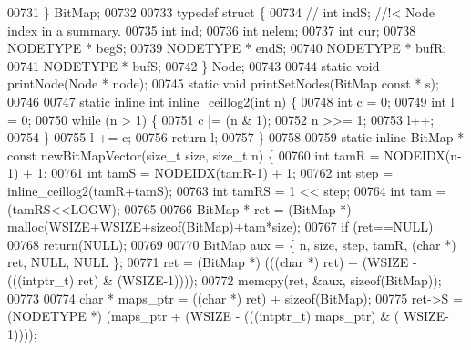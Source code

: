 \begin{DoxyCode}
00731 \} BitMap;
00732 
00733 \textcolor{keyword}{typedef} \textcolor{keyword}{struct }\{
00734 \textcolor{comment}{//      int indS;                       //!< Node index in a summary.}
00735         \textcolor{keywordtype}{int} ind;                        
00736         \textcolor{keywordtype}{int} nelem;                      
00737         \textcolor{keywordtype}{int} cur;                        
00738         NODETYPE * begS;        
00739         NODETYPE * endS;        
00740         NODETYPE * bufR;        
00741         NODETYPE * bufS;        
00742 \} Node;
00743 
00744 \textcolor{keyword}{static} \textcolor{keywordtype}{void} printNode(Node * node);
00745 \textcolor{keyword}{static} \textcolor{keywordtype}{void} printSetNodes(BitMap \textcolor{keyword}{const} * s);
00746 
00747 \textcolor{keyword}{static} \textcolor{keyword}{inline} \textcolor{keywordtype}{int} inline\_ceillog2(\textcolor{keywordtype}{int} n) \{
00748         \textcolor{keywordtype}{int} c = 0;
00749         \textcolor{keywordtype}{int} l = 0;
00750         \textcolor{keywordflow}{while} (n > 1) \{
00751                 c |= (n & 1);
00752                 n >>= 1;
00753                 l++;
00754         \}
00755         l += c;
00756         \textcolor{keywordflow}{return} l;
00757 \}
00758 
00759 \textcolor{keyword}{static} \textcolor{keyword}{inline} BitMap * \textcolor{keyword}{const} newBitMapVector(\textcolor{keywordtype}{size\_t} size, \textcolor{keywordtype}{size\_t} n) \{
00760         \textcolor{keywordtype}{int} tamR = NODEIDX(n-1) + 1;
00761         \textcolor{keywordtype}{int} tamS = NODEIDX(tamR-1) + 1;
00762         \textcolor{keywordtype}{int} step = inline\_ceillog2(tamR+tamS);
00763         \textcolor{keywordtype}{int} tamRS = 1 << step;
00764         \textcolor{keywordtype}{int} tam = (tamRS<<LOGW);
00765 
00766         BitMap * ret = (BitMap *) malloc(WSIZE+WSIZE+\textcolor{keyword}{sizeof}(BitMap)+tam*size);
00767         \textcolor{keywordflow}{if} (ret==NULL)
00768                 \textcolor{keywordflow}{return}(NULL);
00769 
00770         BitMap aux = \{ n, size, step, tamR, (\textcolor{keywordtype}{char} *) ret, NULL, NULL \};
00771         ret =  (BitMap *) (((\textcolor{keywordtype}{char} *) ret) + (WSIZE - (((intptr\_t) ret) & (WSIZE-1))));
00772         memcpy(ret, &aux, \textcolor{keyword}{sizeof}(BitMap));
00773 
00774         \textcolor{keywordtype}{char} * maps\_ptr = ((\textcolor{keywordtype}{char} *) ret) + \textcolor{keyword}{sizeof}(BitMap);
00775         ret->S = (NODETYPE *) (maps\_ptr + (WSIZE - (((intptr\_t) maps\_ptr) & (
      WSIZE-1))));

\end{DoxyCode}
